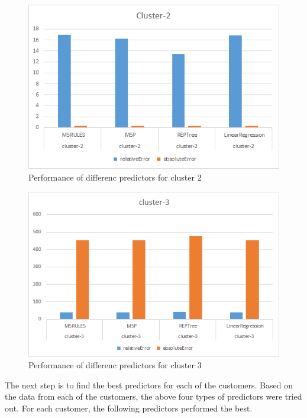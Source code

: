 \begin{figure}[h!]
  \includegraphics[width=\linewidth]{cluster-2-predictors.png}
  \caption{Performance of differenc predictors for cluster 2}
  \label{fig:cluster-2-predictors}
\end{figure}


\begin{figure}[h!]
  \includegraphics[width=\linewidth]{cluster-3-predictors.png}
  \caption{Performance of differenc predictors for cluster 3}
  \label{fig:cluster-3-predictors}
\end{figure}

The next step is to find the best predictors for each of the customers. Based on the data from each of the customers, the above four types of predictors were tried out. For each customer, the following predictors performed the best. 

